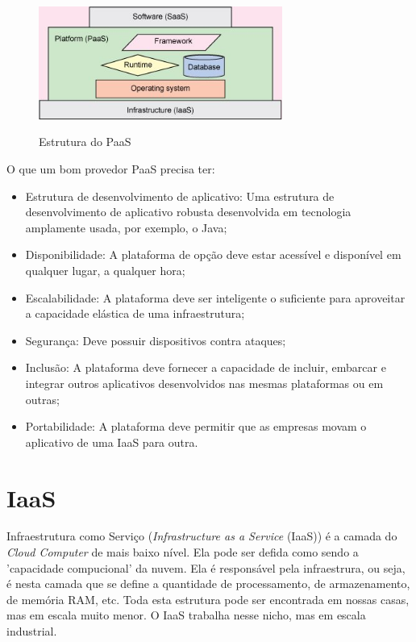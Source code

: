 \documentclass{abnt}
\begin{document}
		\begin{figure}[h]
			\centering
			\includegraphics[width=8cm, keepaspectratio]{img/figure1.jpg}
			\label{fig_paas}
			\caption{Estrutura do PaaS}
		\end{figure}
		
		O que um bom provedor PaaS precisa ter:
			\begin{itemize}
		    \item Estrutura de desenvolvimento de aplicativo: Uma estrutura de desenvolvimento de aplicativo robusta desenvolvida em tecnologia amplamente usada, por exemplo, o Java;
            \item Disponibilidade: A plataforma de opção deve estar acessível e disponível em qualquer lugar, a qualquer hora;
            \item Escalabilidade: A plataforma deve ser inteligente o suficiente para aproveitar a capacidade elástica de uma infraestrutura;
            \item Segurança: Deve possuir dispositivos contra ataques;
            \item Inclusão: A plataforma deve fornecer a capacidade de incluir, embarcar e integrar outros aplicativos desenvolvidos nas mesmas plataformas ou em outras;
            \item Portabilidade: A plataforma deve permitir que as empresas movam o aplicativo de uma IaaS para outra.
		\end{itemize}
		
	\section{IaaS}
		Infraestrutura como Serviço (\textit{Infrastructure as a Service} (IaaS)) é a camada do \textit{Cloud Computer} de mais baixo nível. Ela pode ser defida como sendo a 'capacidade compucional' da nuvem. Ela é responsável pela infraestrura, ou seja, é nesta camada que se define a quantidade de processamento, de armazenamento, de memória RAM, etc. Toda esta estrutura pode ser encontrada em nossas casas, mas em escala muito menor. O IaaS trabalha nesse nicho, mas em escala industrial.
		
\end{document}
